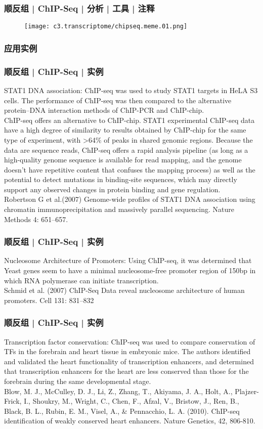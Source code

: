 \begin{frame}
  \frametitle{顺反组 | ChIP-Seq | 分析 | 工具 | 注释}
  \begin{figure}
    \centering
    \texttt{[image: c3.transcriptome/chipseq.meme.01.png]}
  \end{figure}
\end{frame}

\subsubsection{应用实例}
\begin{frame}
  \frametitle{顺反组 | ChIP-Seq | 实例}
  STAT1 DNA association: ChIP-seq was used to study STAT1 targets in HeLA S3 cells. The performance of ChIP-seq was then compared to the alternative protein–DNA interaction methods of ChIP-PCR and ChIP-chip.\\
  ChIP-seq offers an alternative to ChIP-chip. STAT1 experimental ChIP-seq data have a high degree of similarity to results obtained by ChIP-chip for the same type of experiment, with >64\% of peaks in shared genomic regions. Because the data are sequence reads, ChIP-seq offers a rapid analysis pipeline (as long as a high-quality genome sequence is available for read mapping, and the genome doesn't have repetitive content that confuses the mapping process) as well as the potential to detect mutations in binding-site sequences, which may directly support any observed changes in protein binding and gene regulation.\\
  Robertson G et al.(2007) Genome-wide profiles of STAT1 DNA association using chromatin immunoprecipitation and massively parallel sequencing. Nature Methods 4: 651–657.
\end{frame}

\begin{frame}
  \frametitle{顺反组 | ChIP-Seq | 实例}
  Nucleosome Architecture of Promoters: Using ChIP-seq, it was determined that Yeast genes seem to have a minimal nucleosome-free promoter region of 150bp in which RNA polymerase can initiate transcription.\\
  Schmid et al. (2007) ChIP-Seq Data reveal nucleosome architecture of human promoters. Cell 131: 831–832
\end{frame}

\begin{frame}
  \frametitle{顺反组 | ChIP-Seq | 实例}
  Transcription factor conservation: ChIP-seq was used to compare conservation of TFs in the forebrain and heart tissue in embryonic mice. The authors identified and validated the heart functionality of transcription enhancers, and determined that transcription enhancers for the heart are less conserved than those for the forebrain during the same developmental stage.\\
  Blow, M. J., McCulley, D. J., Li, Z., Zhang, T., Akiyama, J. A., Holt, A., Plajzer-Frick, I., Shoukry, M., Wright, C., Chen, F., Afzal, V., Bristow, J., Ren, B., Black, B. L., Rubin, E. M., Visel, A., \& Pennacchio, L. A. (2010). ChIP-seq identification of weakly conserved heart enhancers. Nature Genetics, 42, 806-810.
\end{frame}

